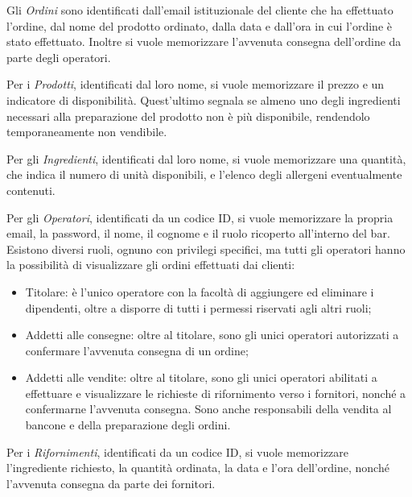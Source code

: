 \documentclass[12pt,a4paper]{article}
\begin{document}
    \vspace{8pt}
    \noindent
    Gli \textit{Ordini} sono identificati dall'email istituzionale del cliente che ha effettuato l'ordine, dal nome del prodotto ordinato, dalla data e dall'ora in cui l'ordine è stato effettuato. Inoltre si vuole memorizzare l'avvenuta consegna dell'ordine da parte degli operatori.
    
    \vspace{8pt}
    \noindent
    Per i \textit{Prodotti}, identificati dal loro nome, si vuole memorizzare il prezzo e un indicatore di disponibilità. Quest'ultimo segnala se almeno uno degli ingredienti necessari alla preparazione del prodotto non è più disponibile, rendendolo temporaneamente non vendibile.

    \vspace{8pt}
    \noindent
    Per gli \textit{Ingredienti},  identificati dal loro nome, si vuole memorizzare una quantità, che indica il numero di unità disponibili, e l'elenco degli allergeni eventualmente contenuti.

    \vspace{8pt}
    \noindent
    Per gli \textit{Operatori}, identificati da un codice ID, si vuole memorizzare la propria email, la password, il nome, il cognome e il ruolo ricoperto all'interno del bar.\\
    Esistono diversi ruoli, ognuno con privilegi specifici, ma tutti gli operatori hanno la possibilità di visualizzare gli ordini effettuati dai clienti:
    \begin{itemize}[leftmargin=1em]
        \item Titolare: è l'unico operatore con la facoltà di aggiungere ed eliminare i dipendenti, oltre a disporre di tutti i permessi riservati agli altri ruoli;
        \item Addetti alle consegne: oltre al titolare, sono gli unici operatori autorizzati a confermare l'avvenuta consegna di un ordine;
        \item Addetti alle vendite: oltre al titolare, sono gli unici operatori abilitati a effettuare e visualizzare le richieste di rifornimento verso i fornitori, nonché a confermarne l'avvenuta consegna. Sono anche responsabili della vendita al bancone e della preparazione degli ordini.
    \end{itemize}

    \vspace{8pt}
    \noindent
    Per i \textit{Rifornimenti}, identificati da un codice ID, si vuole memorizzare l'ingrediente richiesto, la quantità ordinata, la data e l'ora dell'ordine, nonché l'avvenuta consegna da parte dei fornitori.
\end{document}
